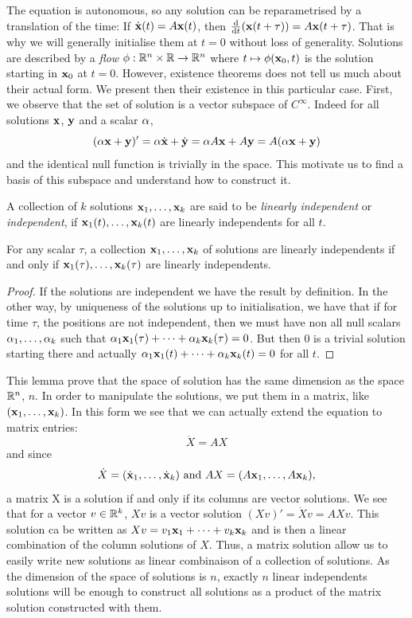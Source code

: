 The equation is autonomous, so any solution can be reparametrised by a translation of the time:
If $\dot{\mathbf{x}}(t)=A\mathbf{x}(t)$, then $\frac{\mathrm{d}}{\mathrm{d} t}(\mathbf{x}(t+\tau))=A\mathbf{x}(t+\tau)$. That is why we will generally initialise them at $t=0$ without loss of generality. Solutions are described by a \emph{flow} $\phi:\mathbb{R}^n\times \mathbb{R}\to\mathbb{R}^n$ where $t\mapsto\phi(\mathbf{x}_0,t)$ is the solution starting in $\mathbf{x}_0$ at $t=0$. However, existence theorems does not tell us much about their actual form. We present then their existence in this particular case.
First, we observe that the set of solution is a vector subspace of $C^\infty$. Indeed for all solutions $\mathbf{x}$, $\mathbf{y}$ and a scalar $\alpha$, \[(\alpha\mathbf{x}+\mathbf{y})'=\alpha\dot{\mathbf{x}} + \dot{\mathbf{y}}=\alpha A\mathbf{x} + A\mathbf{y}=A(\alpha\mathbf{x}+\mathbf{y})\] and the identical null function is trivially in the space. This motivate us to find a basis of this subspace and understand how to construct it.
\begin{definition}
    A collection of $k$ solutions $\mathbf{x}_1,\dots,\mathbf{x}_k$ are said to be \emph{linearly independent} or \emph{independent}, if $\mathbf{x}_1(t),\dots,\mathbf{x}_k(t)$ are linearly independents for all $t$.
\end{definition}
\begin{lemme} \label{lem:indépendance}
For any scalar $\tau$, a collection $\mathbf{x}_1,\dots,\mathbf{x}_k$ of solutions are linearly independents if and only if $\mathbf{x}_1(\tau),\dots,\mathbf{x}_k(\tau)$ are linearly independents.
\end{lemme}
\begin{proof}
If the solutions are independent we have the result by definition. In the other way, by uniqueness of the solutions up to initialisation, we have that if for time $\tau$, the positions are not independent, then we must have non all null scalars $\alpha_1,\dots,\alpha_k$ such that  $\alpha_1\mathbf{x}_1(\tau) + \dots + \alpha_k\mathbf{x}_k(\tau)=0$. But then 0 is a trivial solution starting there and actually  $\alpha_1\mathbf{x}_1(t) + \dots + \alpha_k\mathbf{x}_k(t)=0$ for all $t$.
\end{proof}
This lemma prove that the space of solution has the same dimension as the space $\mathbb{R}^n$, \ie $n$. 
In order to manipulate the solutions, we put them in a matrix, like $(\mathbf{x}_1,\dots,\mathbf{x}_k)$. In this form we see that we can actually extend the equation to matrix entries: 
\[\dot{X}=AX\]
and since 
\[\dot{X}=(\dot{\mathbf{x}}_1,\dots,\dot{\mathbf{x}}_k)  
\text{ and } 
AX=(A\mathbf{x}_1,\dots,A\mathbf{x}_k),\]
a matrix X is a solution if and only if its columns are vector solutions. We see that for a vector $v\in\mathbb{R}^k$, $Xv$ is a vector solution $(Xv)' = \dot{X}v = AXv$. This solution ca be written as $Xv = v_1\mathbf{x}_1 + \dots + v_k\mathbf{x}_k$ and is then a linear combination of the column solutions of $X$. Thus, a matrix solution allow us to easily write new solutions as linear combinaison of a collection of solutions. As the dimension of the space of solutions is $n$, exactly $n$ linear independents solutions will be enough to construct all solutions as a product of the matrix solution constructed with them.

